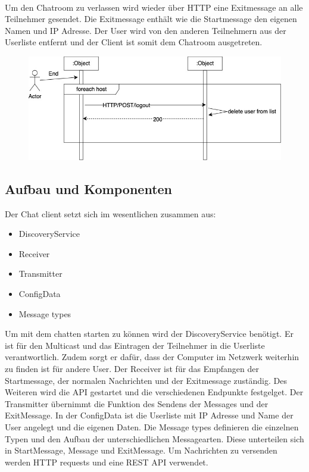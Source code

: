 \\
Um den Chatroom zu verlassen wird wieder über HTTP eine Exitmessage an alle Teilnehmer gesendet. Die Exitmessage enthält wie die Startmessage den eigenen Namen und IP Adresse.
Der User wird von den anderen Teilnehmern aus der Userliste entfernt und der Client ist somit dem Chatroom ausgetreten. 
\begin{figure}[ht]
    \centering
    \includegraphics[scale=0.4]{Images/Exit_Sequenzdiagramm.jpg}
\end{figure}
\newpage
\subsection{Aufbau und Komponenten} %
Der Chat client setzt sich im wesentlichen zusammen aus:
\begin{itemize}
    \item DiscoveryService
    \item Receiver
    \item Transmitter
    \item ConfigData
    \item Message types
\end{itemize} 
Um mit dem chatten starten zu können wird der DiscoveryService benötigt. 
Er ist für den Multicast und das Eintragen der Teilnehmer in die Userliste verantwortlich. Zudem sorgt er dafür, dass der Computer im Netzwerk weiterhin zu finden ist für andere User.
Der Receiver ist für das Empfangen der Startmessage, der normalen Nachrichten und der Exitmessage zuständig. Des Weiteren wird die API gestartet und die verschiedenen Endpunkte festgelget.
Der Transmitter übernimmt die Funktion des Sendens der Messages und der ExitMessage. 
In der ConfigData ist die Userliste mit IP Adresse und Name der User angelegt und die eigenen Daten.
Die Message types definieren die einzelnen Typen und den Aufbau der unterschiedlichen Messagearten. Diese unterteilen sich in StartMessage, Message und ExitMessage.
Um Nachrichten zu versenden werden HTTP requests und eine REST API verwendet. 

